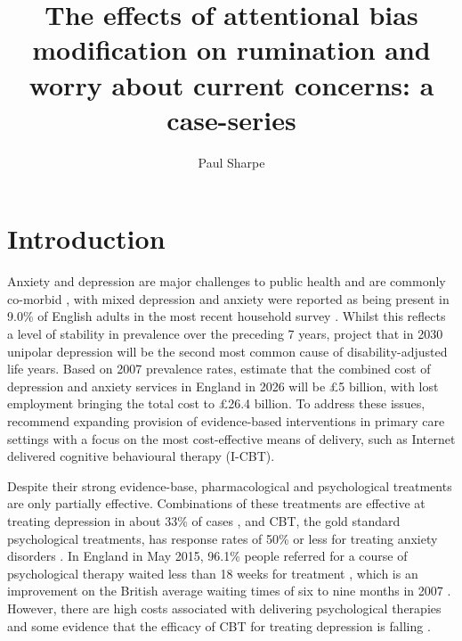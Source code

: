 \documentclass[man,floatsintext,a4paper,biblatex]{apa6}\usepackage[]{graphicx}\usepackage[]{color}
\title{The effects of attentional bias modification on rumination and worry about current concerns: a case-series}
\author{Paul Sharpe}
\affiliation{University of Exeter}
\begin{document}
\thispagestyle{empty}
\setlength{\marginparwidth}{1cm}
\maketitle
{}
\startcontents[sections]
\newpage

\section{Introduction}
\label{introduction}

Anxiety and depression are major challenges to public health and
are commonly co-morbid \parencite{kessler_impairment_1999},
with mixed depression and anxiety were reported as being
present in 9.0\% of English adults in the most recent household
survey \parencite{mcmanus_adult_2009}. Whilst this reflects
a level of stability in prevalence over the preceding 7 years,
\textcite{mathers_projections_2006} project that in 2030 unipolar
depression will be the second most common cause of disability-adjusted
life years. Based on 2007 prevalence rates, \textcite{mccrone_paying_2008}
estimate that the combined cost of depression and anxiety services
in England in 2026 will be \pounds5 billion, with lost employment
bringing the total cost to \pounds26.4 billion. To address these
issues, \textcite{mccrone_paying_2008} recommend expanding provision of
evidence-based interventions in primary care settings with a focus on
the most cost-effective means of delivery, such as Internet delivered
cognitive behavioural therapy (I-CBT).

Despite their strong evidence-base, pharmacological and psychological
treatments are only partially effective. Combinations of these
treatments are effective at treating depression in about 33\%  of
cases \parencite{andrews_utilising_2004}, and CBT, the gold standard
psychological treatments, has response rates of 50\% or less for
treating anxiety disorders \parencite{schneider_state_2015}. In
England in May 2015, 96.1\% people referred for a course of
psychological therapy waited less than 18 weeks for treatment
\parencite{hsiccommunityandmentalhealthteam_improving_2015}, which is an
improvement on the British average waiting times of six to nine months
in 2007 \parencite{haliwell_fundamental_2007}. However, there are
high costs associated with delivering psychological therapies and some
evidence that the efficacy of CBT for treating depression is falling
\parencite{johnsen_effects_2015}.
\end{document}
